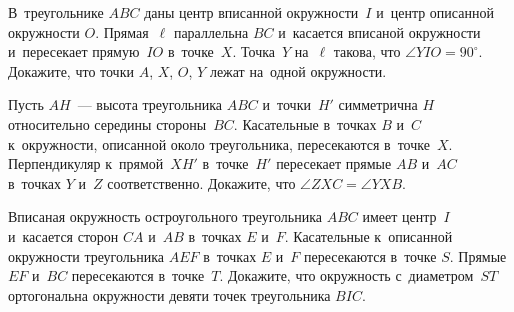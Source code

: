 \begin{problems}
\item
В~треугольнике $ABC$ даны центр вписанной окружности~$I$ и~центр описанной
окружности $O$.
Прямая~$\ell$ параллельна $BC$ и~касается вписаной окружности и~пересекает
прямую~$IO$ в~точке~$X$.
Точка~$Y$ на~$\ell$ такова, что $\angle YIO = 90^\circ$.
Докажите, что точки $A$, $X$, $O$, $Y$ лежат на~одной окружности.

\item
Пусть $AH$~--- высота треугольника $ABC$ и~точки~$H'$ симметрична $H$
относительно середины стороны~$BC$.
Касательные в~точках $B$ и~$C$ к~окружности, описанной около треугольника,
пересекаются в~точке~$X$.
Перпендикуляр к~прямой~$XH'$ в~точке~$H'$
пересекает прямые $AB$ и~$AC$ в~точках $Y$ и~$Z$ соответственно.
Докажите, что $\angle ZXC = \angle YXB$.

\item
Вписаная окружность остроугольного треугольника $ABC$ имеет центр~$I$
и~касается сторон $CA$ и~$AB$ в~точках $E$ и~$F$.
Касательные к~описанной окружности треугольника $AEF$ в~точках $E$ и~$F$
пересекаются в~точке $S$.
Прямые $EF$ и~$BC$ пересекаются в~точке~$T$.
Докажите, что окружность с~диаметром~$ST$ ортогональна окружности девяти точек
треугольника $BIC$.



\end{problems}

